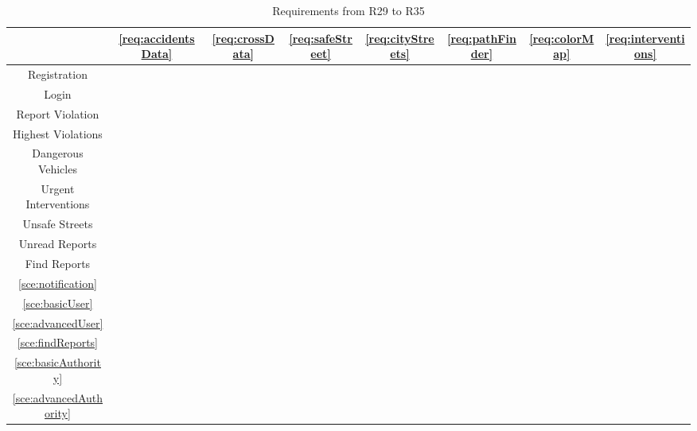 		\begin{table}[h]
			\centering
			\begin{minipage}{0.5\textheight}
				\centering
				\begin{tabular}{|c|c|c|c|c|c|c|c|}
					\cline{2-8}
					\multicolumn{1}{c|}{} & \ref{req:accidentsData} & \ref{req:crossData} & \ref{req:safeStreet} & \ref{req:cityStreets} & \ref{req:pathFinder} & \ref{req:colorMap} & \ref{req:interventions} \\
					\hline
					Registration & & & & & & &\\
					\hline
					Login & & & & & & &\\
					\hline
					Report Violation & & & & & & & \\
					\hline
					Highest Violations & & & & & & & \\
					\hline
					Dangerous Vehicles & & & & & & & \\
					\hline
					Urgent Interventions & \xmark & \xmark & & \xmark & & &\xmark \\
					\hline
					Unsafe Streets & \xmark & \xmark & \xmark & \xmark & \xmark & \xmark &\\
					\hline
					Unread Reports & & & & & & &\\
					\hline
					Find Reports & & & & & & &\\
					\hline
					\ref{sce:notification} & & & & & & & \\
					\hline
					\ref{sce:basicUser} & & & & & & & \\
					\hline
					\ref{sce:advancedUser} & \xmark & \xmark & \xmark & \xmark & \xmark & \xmark &\\
					\hline
					\ref{sce:findReports} & & & & & & &\\
					\hline
					\ref{sce:basicAuthority} & & & & & & & \\
					\hline
					\ref{sce:advancedAuthority} & \xmark & \xmark & & \xmark & & &\xmark \\
					\hline
				\end{tabular}
				\vspace{0.4cm}
				\caption{Requirements from R29 to R35}
			\end{minipage}
		\end{table}
		
	\FloatBarrier
	
